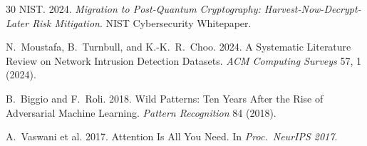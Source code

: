 \documentclass[sigconf,nonacm]{acmart}
\begin{document}
\begin{thebibliography}{30}
NIST. 2024. \textit{Migration to Post-Quantum Cryptography:
Harvest-Now-Decrypt-Later Risk Mitigation}.
NIST Cybersecurity Whitepaper.

N.~Moustafa, B.~Turnbull, and K.-K.~R.~Choo. 2024. A Systematic
Literature Review on Network Intrusion Detection Datasets.
\textit{ACM Computing Surveys} 57, 1 (2024).

B.~Biggio and F.~Roli. 2018. Wild Patterns: Ten Years After the
Rise of Adversarial Machine Learning. \textit{Pattern Recognition}
84 (2018).

A.~Vaswani et al. 2017. Attention Is All You Need.
In \textit{Proc.\ NeurIPS 2017}.

\end{thebibliography}
\end{document}
